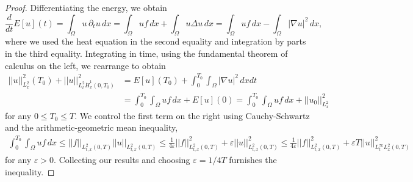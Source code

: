 \documentclass[reqno]{amsart}
\theoremstyle{definition}
\theoremstyle{remark}
\renewcommand{\epsilon}{\varepsilon}
\begin{document}
\begin{proof}
	Differentiating the energy, we obtain
		\[ \frac{d}{dt} E[u] (t) = \int_\Omega u \, \partial_t u \, dx = \int_\Omega u f \, dx + \int_\Omega u \Delta u \, dx = \int_\Omega u f \, dx - \int_\Omega |\nabla u|^2 \, dx, \]
	where we used the heat equation in the second equality and integration by parts in the third equality. Integrating in time, using the fundamental theorem of calculus on the left, we rearrange to obtain
		\begin{align*}
			 ||u||_{L^2_x}^2 (T_0) + || u ||_{L^2_t \dot H^1_x(0, T_0)}^2 
			 	&=  E[u] (T_0) + \int_0^{T_0} \int_\Omega |\nabla u|^2 \, dx dt \\
			 	&= \int_0^{T_0} \int_\Omega u f \, dx + E[u](0) = \int_0^{T_0} \int_\Omega u f \, dx + ||u_0||_{L^2_x}^2 
		\end{align*}	 	
	for any $0 \leq T_0 \leq T$. We control the first term on the right using Cauchy-Schwartz and the arithmetic-geometric mean inequality,  
		\begin{align*}
			\int_0^{T_0} \int_\Omega u f \, dx \leq ||f||_{L^2_{t, x} (0, T)} ||u||_{L^2_{t, x} (0, T)} \leq \frac{1}{4\epsilon} ||f||_{L^2_{t, x} (0, T)}^2 + \epsilon ||u||_{L^2_{t, x}(0, T)}^2 \leq \frac{1}{4\epsilon} ||f||_{L^2_{t, x} (0, T)}^2 + \epsilon T ||u||_{L^\infty_t L^2_x (0, T)}^2  
		\end{align*}	
	for any $\epsilon > 0$. Collecting our results and choosing $\epsilon = 1/4T$ furnishes the inequality. 
\end{proof}
\end{document}
